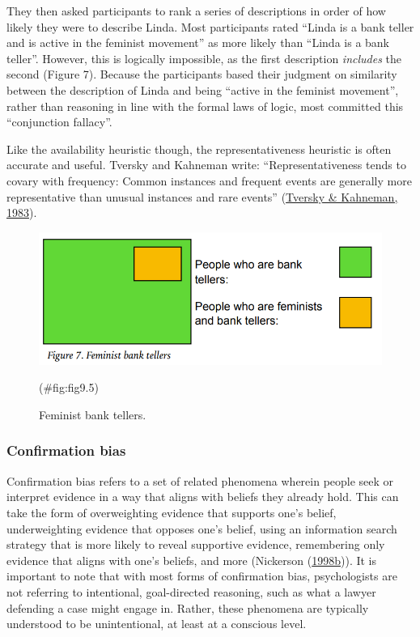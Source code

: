\documentclass[
]{krantz}
\begin{document}
They then asked participants to rank a series of descriptions in order of how likely they were to describe Linda. Most participants rated ``Linda is a bank teller and is active in the feminist movement'' as more likely than ``Linda is a bank teller''. However, this is logically impossible, as the first description \emph{includes} the second (Figure 7). Because the participants based their judgment on similarity between the description of Linda and being ``active in the feminist movement'', rather than reasoning in line with the formal laws of logic, most committed this ``conjunction fallacy''.

Like the availability heuristic though, the representativeness heuristic is often accurate and useful. Tversky and Kahneman write: ``Representativeness tends to covary with frequency: Common instances and frequent events are generally more representative than unusual instances and rare events'' (\protect\hyperlink{ref-tversky1983extensional}{Tversky \& Kahneman, 1983}).

\begin{figure}

{\centering \includegraphics[width=0.6\linewidth]{images/ch9/fig5} 

}

\caption{Feminist bank tellers.}(\#fig:fig9.5)
\end{figure}

\hypertarget{confirmation-bias-1}{%
\subsubsection*{Confirmation bias}\label{confirmation-bias-1}}


Confirmation bias refers to a set of related phenomena wherein people seek or interpret evidence in a way that aligns with beliefs they already hold. This can take the form of overweighting evidence that supports one's belief, underweighting evidence that opposes one's belief, using an information search strategy that is more likely to reveal supportive evidence, remembering only evidence that aligns with one's beliefs, and more (Nickerson (\protect\hyperlink{ref-nickerson1998confirmation}{1998b})). It is important to note that with most forms of confirmation bias, psychologists are not referring to intentional, goal-directed reasoning, such as what a lawyer defending a case might engage in. Rather, these phenomena are typically understood to be unintentional, at least at a conscious level.
\end{document}
